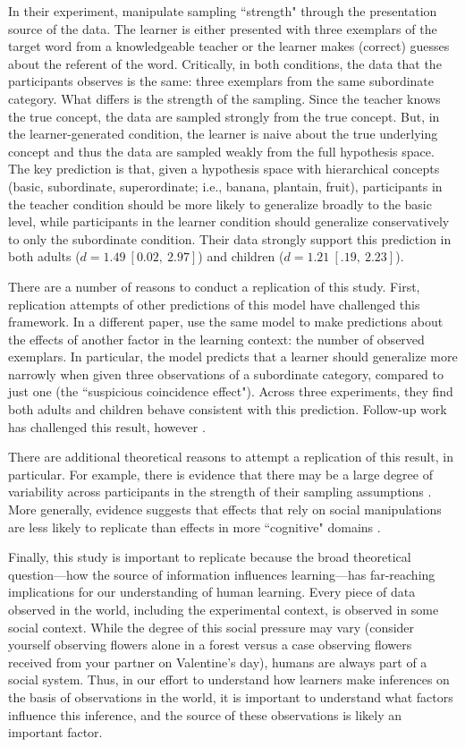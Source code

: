\documentclass[man]{apa2}
\begin{document}
In their experiment,  manipulate  sampling  ``strength"  through  the presentation source of the data. The learner is either presented with three exemplars of the target word from a knowledgeable teacher or the learner makes (correct) guesses about the referent of the word. Critically, in both conditions, the data that the participants observes is the same:  three exemplars from the same subordinate category. What differs is the strength of the sampling.  Since the teacher  knows the true concept, the data are sampled strongly from the true concept. But, in the learner-generated condition, the learner is naive about the true underlying concept and thus the data are sampled weakly from the full hypothesis space.  The key prediction is that, given a hypothesis space with hierarchical concepts (basic, subordinate, superordinate; i.e., banana, plantain, fruit),  participants in the teacher condition should be more likely to generalize broadly to the basic level, while participants in the learner condition should generalize conservatively to only the subordinate condition. Their data strongly support this prediction in both adults ($d = 1.49\ [0.02,\ 2.97]$) and children  ($d = 1.21\ [.19,\ 2.23]$).

There are a number of reasons to conduct a replication of this study. First, replication attempts of other predictions of this model have challenged this framework. In a different paper,   use the same model to make predictions about the effects of another factor in the learning context: the number of observed exemplars. In particular, the model predicts that a learner should generalize more narrowly when given three observations of a subordinate category, compared to just one (the ``suspicious coincidence effect"). Across three experiments, they find both adults and children behave consistent with this prediction. Follow-up work has challenged this result, however \cite{jenkins2015non,spencer2011}. 

There are additional theoretical reasons to attempt a replication of this result, in particular. For example, there is evidence that there may be a large degree of variability across participants in the strength of their sampling assumptions \cite{navarro2012sampling}. More generally, evidence suggests that effects that rely on social manipulations are less likely to replicate than effects in more ``cognitive" domains \cite{reproProj2015}.

Finally, this study is important to replicate because the broad theoretical question---how the source of information influences learning---has far-reaching implications for our understanding of human learning. Every piece of data observed in the world, including the experimental context,  is observed in some social context. While the degree of this social pressure may vary (consider yourself observing flowers  alone in a forest versus a case observing flowers received from your partner on Valentine's day), humans are always part of a social system. Thus, in our effort to understand how learners make inferences on the basis of observations in the world, it is important to understand what factors influence this inference, and the source of these observations is likely an important factor.
\end{document}
